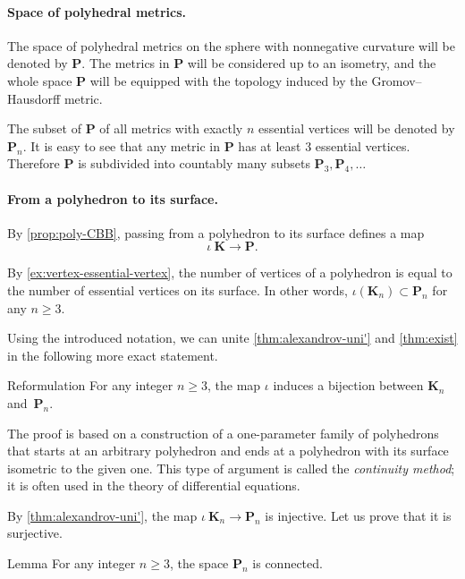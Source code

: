 \paragraph{Space of polyhedral metrics.}
The space of polyhedral metrics on the sphere with nonnegative curvature will be denoted by $\mathbf{P}$.
The metrics in $\mathbf{P}$ will be considered up to an isometry, and the whole space $\mathbf{P}$ will be equipped with the topology induced by the Gromov--Hausdorff metric.

The subset of $\mathbf{P}$ of all metrics with exactly $n$ essential vertices will be denoted by $\mathbf{P}_n$.
It is easy to see that any metric in $\mathbf{P}$ has at least 3 essential vertices.
Therefore $\mathbf{P}$ is subdivided into countably many subsets
 $\mathbf{P}_3,\mathbf{P}_4,\dots$

\paragraph{From a polyhedron to its surface.}

By \ref{prop:poly-CBB}, passing from a polyhedron to its surface defines a map
\[\iota\:\mathbf{K}\to \mathbf{P}.\]

By \ref{ex:vertex-essential-vertex}, the number of vertices of a polyhedron is equal to the number of essential vertices on its surface.
In other words, $\iota(\mathbf{K}_n)\subset \mathbf{P}_n$ for any $n\ge 3$.

Using the introduced notation, we can unite \ref{thm:alexandrov-uni'} and \ref{thm:exist} in the following more exact statement.

\begin{thm}{Reformulation}
For any integer $n\ge 3$,
the map $\iota$ induces a bijection between $\mathbf{K}_n$ and~$\mathbf{P}_n$.
\end{thm}

The proof is based on a construction of a one-parameter family of polyhedrons that starts at an arbitrary polyhedron
and ends at a polyhedron with its surface isometric to the given one.
This type of argument is called the \textit{continuity method}; it is often used in the theory of differential equations.


By \ref{thm:alexandrov-uni'}, the map $\iota\:\mathbf{K}_n\to\mathbf{P}_n$ is injective.
Let us prove that it is surjective.

\begin{thm}{Lemma}
For any integer $n\ge 3$, the space $\mathbf{P}_n$ is connected.
\end{thm}

